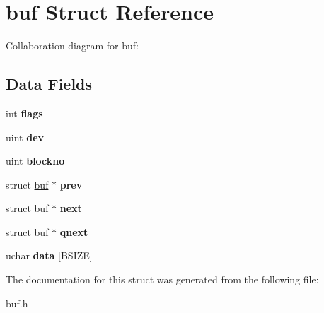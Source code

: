 \hypertarget{structbuf}{}\section{buf Struct Reference}
\label{structbuf}


Collaboration diagram for buf\+:
\subsection*{Data Fields}
\begin{DoxyCompactItemize}
\item 
\mbox{\label{structbuf_ae7d6b6c34fdeadb38970efd0554aa1a9}} 
int {\bfseries flags}
\item 
\mbox{\label{structbuf_ac96082c2b5f22133ac7092ef81487227}} 
uint {\bfseries dev}
\item 
\mbox{\label{structbuf_a756b2bcc88008bef7f21d688aa4a7a48}} 
uint {\bfseries blockno}
\item 
\mbox{\label{structbuf_a930cab1e1b3751795d31bfd0291dff4a}} 
struct \mbox{\hyperlink{structbuf}{buf}} $\ast$ {\bfseries prev}
\item 
\mbox{\label{structbuf_ab18c18abb22f07617619e9a74c71f51a}} 
struct \mbox{\hyperlink{structbuf}{buf}} $\ast$ {\bfseries next}
\item 
\mbox{\label{structbuf_aba5c088c4da07a5ec88edfacdae9b85a}} 
struct \mbox{\hyperlink{structbuf}{buf}} $\ast$ {\bfseries qnext}
\item 
\mbox{\label{structbuf_ab0ec38784ab94ed35e575cf6d33912d2}} 
uchar {\bfseries data} \mbox{[}B\+S\+I\+ZE\mbox{]}
\end{DoxyCompactItemize}


The documentation for this struct was generated from the following file\+:\begin{DoxyCompactItemize}
\item 
buf.\+h\end{DoxyCompactItemize}
